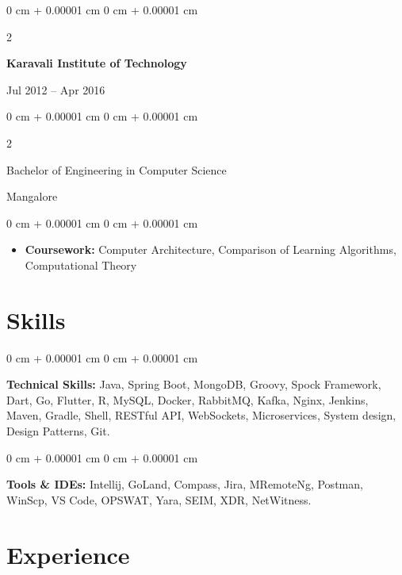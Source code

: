 \documentclass[10pt, letterpaper]{article}
\newenvironment{highlights}{
    \begin{itemize}[
        topsep=0.10 cm,
        parsep=0.10 cm,
        partopsep=0pt,
        itemsep=0pt,
        leftmargin=0 cm + 10pt
    ]
}{
    \end{itemize}
} %
\newenvironment{onecolentry}{
    \begin{adjustwidth}{
        0 cm + 0.00001 cm
    }{
        0 cm + 0.00001 cm
    }
}{
    \end{adjustwidth}
} %
\newenvironment{twocolentry}[2][]{
    \onecolentry
    \def\secondColumn{#2}
    \setcolumnwidth{\fill, 4.5 cm}
    \begin{paracol}{2}
}{
    \switchcolumn \raggedleft \secondColumn
    \end{paracol}
    \endonecolentry
} %
\begin{document}
        \begin{twocolentry}{Jul 2012 – Apr 2016}
            \textbf{Karavali Institute of Technology}
        \end{twocolentry}
        \begin{twocolentry}{Mangalore}
            Bachelor of Engineering in Computer Science
        \end{twocolentry}
        \begin{onecolentry}
            \begin{highlights}
                \item \textbf{Coursework:} Computer Architecture, Comparison of Learning Algorithms, Computational Theory
            \end{highlights}
        \end{onecolentry}

    \section{Skills}
        
        \begin{onecolentry}
            \textbf{Technical Skills:} Java, Spring Boot, MongoDB, Groovy, Spock Framework, Dart,  Go, Flutter, R, MySQL, Docker, RabbitMQ, Kafka, Nginx, Jenkins, Maven, Gradle, Shell, RESTful API, WebSockets, Microservices, System design, Design Patterns, Git. \end{onecolentry}

        \vspace{0.2 cm}

        \begin{onecolentry}
            \textbf{Tools \& IDEs:} Intellij, GoLand, Compass, Jira, MRemoteNg, Postman, WinScp, VS Code, OPSWAT, Yara, SEIM, XDR, NetWitness.
        \end{onecolentry}
   


        
    \section{Experience}
\end{document}
